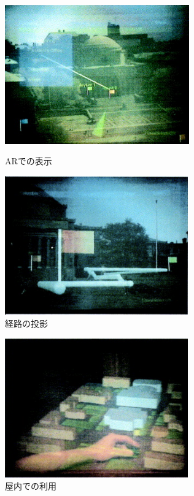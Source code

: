 \begin{figure}[H]
  \begin{minipage}{0.5\hsize}
    \centering 
    \includegraphics[height=60mm]{images/mars_ar.png}
    \caption{ARでの表示} \label{fig:mars_ar}
  \end{minipage}
  \begin{minipage}{0.5\hsize}
    \centering 
    \includegraphics[height=60mm]{images/mars_route.png}
    \caption{経路の投影} \label{fig:mars_route}
  \end{minipage}
\end{figure}


\begin{figure}[H]
  \centering
  \includegraphics[height=60mm]{images/mars_ar_indoor.png}
  \caption{屋内での利用} \label{fig:mars_ar_indoor}
\end{figure}


